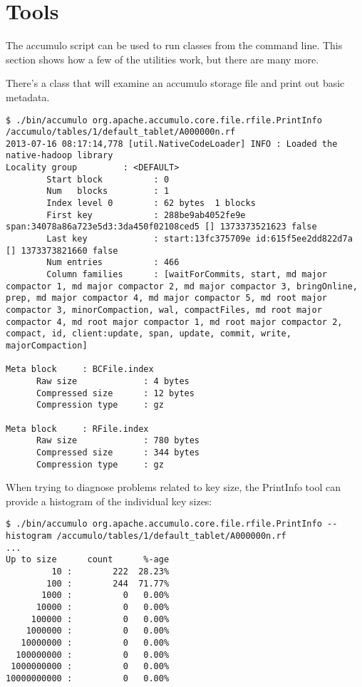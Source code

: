 \section{Tools}

The accumulo script can be used to run classes from the command line.
This section shows how a few of the utilities work, but there are many
more.

There's a class that will examine an accumulo storage file and print
out basic metadata.  

\small
\begin{verbatim}
$ ./bin/accumulo org.apache.accumulo.core.file.rfile.PrintInfo /accumulo/tables/1/default_tablet/A000000n.rf
2013-07-16 08:17:14,778 [util.NativeCodeLoader] INFO : Loaded the native-hadoop library
Locality group         : <DEFAULT>
        Start block          : 0
        Num   blocks         : 1
        Index level 0        : 62 bytes  1 blocks
        First key            : 288be9ab4052fe9e span:34078a86a723e5d3:3da450f02108ced5 [] 1373373521623 false
        Last key             : start:13fc375709e id:615f5ee2dd822d7a [] 1373373821660 false
        Num entries          : 466
        Column families      : [waitForCommits, start, md major compactor 1, md major compactor 2, md major compactor 3, bringOnline, prep, md major compactor 4, md major compactor 5, md root major compactor 3, minorCompaction, wal, compactFiles, md root major compactor 4, md root major compactor 1, md root major compactor 2, compact, id, client:update, span, update, commit, write, majorCompaction]

Meta block     : BCFile.index
      Raw size             : 4 bytes
      Compressed size      : 12 bytes
      Compression type     : gz

Meta block     : RFile.index
      Raw size             : 780 bytes
      Compressed size      : 344 bytes
      Compression type     : gz
\end{verbatim}
\normalsize

When trying to diagnose problems related to key size, the PrintInfo tool can provide a histogram of the individual key sizes:

\small
\begin{verbatim}
$ ./bin/accumulo org.apache.accumulo.core.file.rfile.PrintInfo --histogram /accumulo/tables/1/default_tablet/A000000n.rf
...
Up to size      count      %-age
         10 :        222  28.23%
        100 :        244  71.77%
       1000 :          0   0.00%
      10000 :          0   0.00%
     100000 :          0   0.00%
    1000000 :          0   0.00%
   10000000 :          0   0.00%
  100000000 :          0   0.00%
 1000000000 :          0   0.00%
10000000000 :          0   0.00%
\end{verbatim}
\normalsize

